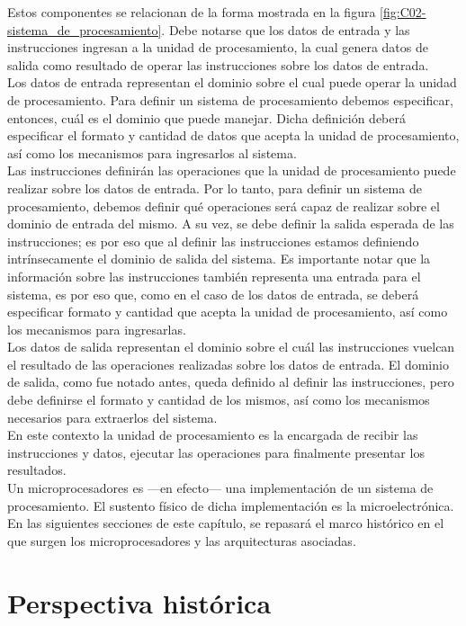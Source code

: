 Estos componentes se relacionan de la forma mostrada en la figura
\ref{fig:C02-sistema_de_procesamiento}. Debe notarse que los datos de entrada y
las instrucciones ingresan a la unidad de procesamiento, la cual genera datos de
salida como resultado de operar las instrucciones sobre los datos de entrada.\\
Los datos de entrada representan el dominio sobre el cual puede operar la unidad
de procesamiento. Para definir un sistema de procesamiento debemos especificar,
entonces, cuál es el dominio que puede manejar. Dicha definición deberá
especificar el formato y cantidad de datos que acepta la unidad de
procesamiento, así como los mecanismos para ingresarlos al sistema.\\
Las instrucciones definirán las operaciones que la unidad de procesamiento
puede realizar sobre los datos de entrada. Por lo tanto, para definir un sistema
de procesamiento, debemos definir qué operaciones será capaz de realizar sobre
el dominio de entrada del mismo. A su vez, se debe definir la salida esperada de
las instrucciones; es por eso que al definir las instrucciones estamos
definiendo intrínsecamente el dominio de salida del sistema. Es importante notar
que la información sobre las instrucciones también representa una entrada para
el sistema, es por eso que, como en el caso de los datos de entrada, se deberá
especificar formato y cantidad que acepta la unidad de procesamiento, así como
los mecanismos para ingresarlas.\\
Los datos de salida representan el dominio sobre el cuál las instrucciones
vuelcan el resultado de las operaciones realizadas sobre los datos de entrada.
El dominio de salida, como fue notado antes, queda definido al definir las
instrucciones, pero debe definirse el formato y cantidad de los mismos, así como
los mecanismos necesarios para extraerlos del sistema.\\
En este contexto la unidad de procesamiento es la encargada de recibir las
instrucciones y datos, ejecutar las operaciones para finalmente presentar los
resultados.\\
Un microprocesadores es ---en efecto--- una implementación de un sistema de
procesamiento. El sustento físico de dicha implementación es la
microelectrónica. En las siguientes secciones de este capítulo, se repasará el
marco histórico en el que surgen los microprocesadores y las arquitecturas
asociadas.

\section{Perspectiva histórica}
\label{sec:theory-history}

